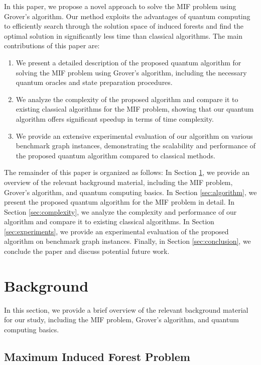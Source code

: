 In this paper, we propose a novel approach to solve the MIF problem using Grover's algorithm. Our method exploits the advantages of quantum computing to efficiently search through the solution space of induced forests and find the optimal solution in significantly less time than classical algorithms. The main contributions of this paper are:

\begin{enumerate}
    \item We present a detailed description of the proposed quantum algorithm for solving the MIF problem using Grover's algorithm, including the necessary quantum oracles and state preparation procedures.
    
    \item We analyze the complexity of the proposed algorithm and compare it to existing classical algorithms for the MIF problem, showing that our quantum algorithm offers significant speedup in terms of time complexity.
    
    \item We provide an extensive experimental evaluation of our algorithm on various benchmark graph instances, demonstrating the scalability and performance of the proposed quantum algorithm compared to classical methods.
\end{enumerate}

The remainder of this paper is organized as follows: In Section \ref{sec:background}, we provide an overview of the relevant background material, including the MIF problem, Grover's algorithm, and quantum computing basics. In Section \ref{sec:algorithm}, we present the proposed quantum algorithm for the MIF problem in detail. In Section \ref{sec:complexity}, we analyze the complexity and performance of our algorithm and compare it to existing classical algorithms. In Section \ref{sec:experiments}, we provide an experimental evaluation of the proposed algorithm on benchmark graph instances. Finally, in Section \ref{sec:conclusion}, we conclude the paper and discuss potential future work.

\section{Background} \label{sec:background}

In this section, we provide a brief overview of the relevant background material for our study, including the MIF problem, Grover's algorithm, and quantum computing basics.

\subsection{Maximum Induced Forest Problem}

